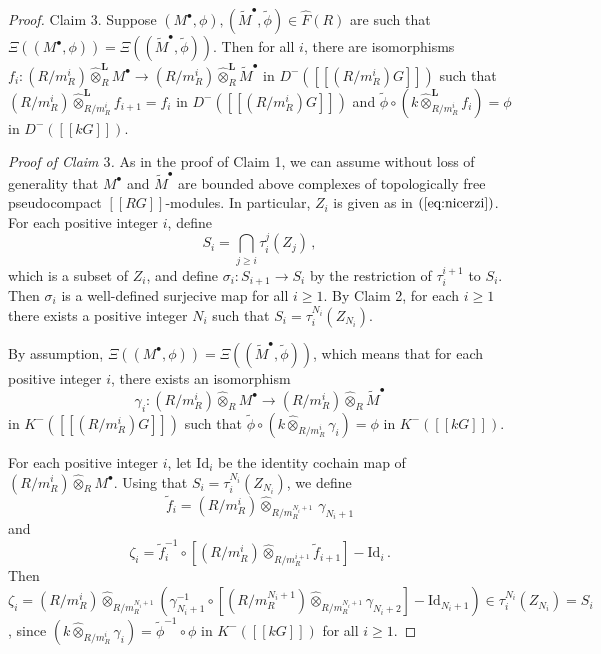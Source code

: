 \documentclass{amsart}
\theoremstyle{plain}
\theoremstyle{definition}
\theoremstyle{remark}
\begin{document}
\begin{proof}
\medskip

\noindent
{\sc Claim 3.} Suppose $(M^\bullet,\phi), (\widetilde{M}^\bullet,\widetilde{\phi})
\in \hat{F}(R)$ are such that $\Xi((M^\bullet,\phi))=
\Xi((\widetilde{M}^\bullet,\widetilde{\phi}))$. Then for all $i$, there are isomorphisms
$f_i: {(R/m_R^i)\hat{\otimes}^{\mathbf{L}}_R {M}^\bullet} \to 
{(R/m_R^i)\hat{\otimes}^{\mathbf{L}}_R \widetilde{M}^\bullet}$ in $D^-([[(R/m_R^i)G]])$ such that
$(R/m_R^i)\hat{\otimes}^{\mathbf{L}}_{R/m_R^{i}}f_{i+1}= f_i$ in $D^-([[(R/m_R^i)G]])$ and 
$\widetilde{\phi}\circ(k\hat{\otimes}^{\mathbf{L}}_{R/m_R^{i}}f_{i})=\phi$ in $D^-([[kG]])$.

\medskip

\noindent
\textit{Proof of Claim $3$.}
As in the proof of Claim 1, we can assume without loss of generality that $M^\bullet$ and 
$\widetilde{M}^\bullet$ are bounded
above complexes of topologically free pseudocompact $[[RG]]$-modules. In particular, $Z_i$ is
given as in $(\ref{eq:nicerzi})$. For each positive integer $i$, define 
$$S_i=\bigcap_{j\ge i} \tau_i^j(Z_j)\,,$$
which is a subset of $Z_i$, and define $\sigma_i:S_{i+1}\to S_i$ by the restriction of
$\tau_i^{i+1}$ to $S_i$. Then $\sigma_i$ is a well-defined surjecive map for all $i\ge 1$. 
By Claim 2, for each $i\ge 1$ there exists a positive integer $N_i$ such that
$S_i=\tau_i^{N_i}(Z_{N_i})$.

By assumption, $\Xi((M^\bullet,\phi))=\Xi((\widetilde{M}^\bullet,\widetilde{\phi}))$, which means
that for each positive integer $i$, there exists an isomorphism
$$\gamma_i:{(R/m_R^i)\hat{\otimes}_R {M}^\bullet} \to {(R/m_R^i)\hat{\otimes}_R \widetilde{M}^\bullet}$$
in $K^-([[(R/m_R^i)G]])$ such that
$\widetilde{\phi}\circ(k\hat{\otimes}_{R/m_R^{i}}\gamma_{i})=\phi$ in $K^-([[kG]])$. 

For each positive integer $i$, let $\mathrm{Id}_i$ be the identity cochain map
of $(R/m_R^i)\hat{\otimes}_RM^\bullet$.
Using that $S_i=\tau_i^{N_i}(Z_{N_i})$, we define 
\begin{equation}
\label{eq:fi}
\tilde{f}_i=(R/m_R^i)\hat{\otimes}_{R/m_R^{N_i+1}}\,\gamma_{N_i+1}
\end{equation}
and
\begin{equation}
\label{eq:xi}
\zeta_i=\tilde{f}_i^{-1}\circ\left[(R/m_R^i)\hat{\otimes}_{R/m_R^{i+1}} \tilde{f}_{i+1}\right]-\mathrm{Id}_i\,.
\end{equation}
Then $\zeta_i=(R/m_R^i)\hat{\otimes}_{R/m_R^{N_i+1}}\left(
\gamma_{N_i+1}^{-1}\circ [(R/m_R^{N_i+1})\hat{\otimes}_{R/m_R^{N_i+1}} \gamma_{N_i+2}]-
\mathrm{Id}_{N_i+1}\right)\in \tau_i^{N_i}(Z_{N_i})=S_i$, since
$(k\hat{\otimes}_{R/m_R^{i}}\gamma_{i})=\widetilde{\phi}^{-1}\circ\phi$
in $K^-([[kG]])$ for all $i\ge 1$. 


\end{proof}
\end{document}
